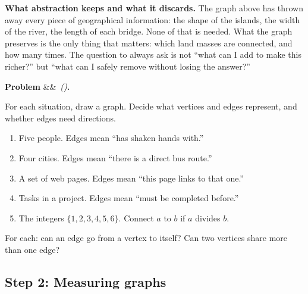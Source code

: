 \documentclass[12pt, a4paper]{article}
\newcounter{problem}
\newenvironment{problem}[1][]{%
  \refstepcounter{problem}%
  \par\vspace{6pt}%
  \noindent\textbf{\color{MidBlue}Problem \theproblem}%
  \ifx&#1&\else\ \textit{(#1)}\fi\textbf{.}\enskip
}{\par\vspace{4pt}}
\begin{document}
\begin{thought}
\textbf{What abstraction keeps and what it discards.}
The graph above has thrown away every piece of geographical information: the shape of the islands, the width of the river, the length of each bridge. None of that is needed. What the graph preserves is the only thing that matters: which land masses are connected, and how many times. The question to always ask is not ``what can I add to make this richer?'' but ``what can I safely remove without losing the answer?''
\end{thought}

\begin{problem}
\label{prob:examples}
For each situation, draw a graph. Decide what vertices and edges represent, and whether edges need directions.
\begin{enumerate}[label=(\alph*),topsep=2pt]
  \item Five people. Edges mean ``has shaken hands with.''
  \item Four cities. Edges mean ``there is a direct bus route.''
  \item A set of web pages. Edges mean ``this page links to that one.''
  \item Tasks in a project. Edges mean ``must be completed before.''
  \item The integers $\{1,2,3,4,5,6\}$. Connect $a$ to $b$ if $a$ divides $b$.
\end{enumerate}
For each: can an edge go from a vertex to itself? Can two vertices share more than one edge?
\end{problem}

\subsection{Step 2: Measuring graphs}
\end{document}
